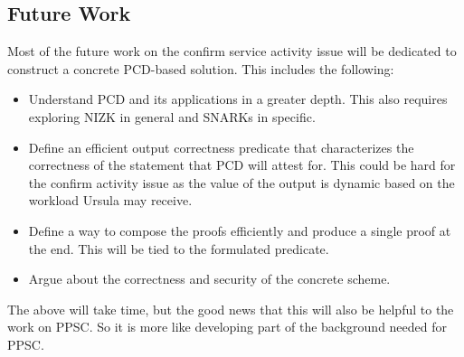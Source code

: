 \subsection{Future Work}
\label{future-work}
Most of the future work on the confirm service activity issue 
will be dedicated to construct a concrete PCD-based solution. This 
includes the following:
\begin{itemize}
\item Understand PCD and its applications in a greater depth. This 
also requires exploring NIZK in general and SNARKs in specific. 

\item Define an efficient output correctness predicate that characterizes 
the correctness of the statement that PCD will attest for. This could be 
hard for the confirm activity issue as the value of the output is dynamic 
based on the workload Ursula may receive.

\item Define a way to compose the proofs efficiently and produce 
a single proof at the end. This will be tied to the formulated predicate.

\item Argue about the correctness and security of the concrete scheme.
\end{itemize} 


The above will take time, but the good news that this will also be helpful
to the work on PPSC. So it is more like developing part of the
background needed for PPSC.
